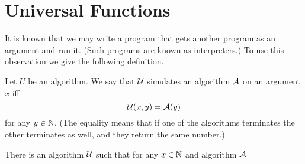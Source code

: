 \chapter{Universal Functions}
It is known that we may write a program that gets another program as an argument
and run it. (Such programs are known as interpreters.) To use this observation
we give the following definition.
\begin{definition}
  Let $U$ be an algorithm. We say that $\mathcal{U}$ simulates an
  algorithm $\mathcal{A}$ on an argument $x$ iff
  \[
    \mathcal{U}(x, y) = \mathcal{A}(y)
  \]
  for any $y \in \mathbb{N}$. (The equality means that if one of the algorithms
  terminates the other terminates as well, and they return the same number.)
\end{definition}
\begin{theorem}
  There is an algorithm $\mathcal{U}$ such that for any $x \in \mathbb{N}$
  and algorithm $\mathcal{A}$
\end{theorem}
